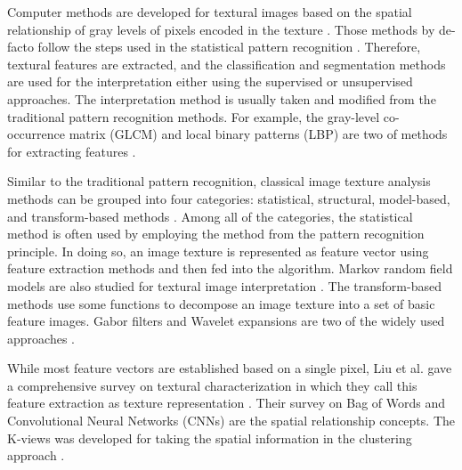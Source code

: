 \documentclass{aci}
\numberwithin{equation}{section}
\begin{document}
Computer methods are developed for textural images based on the spatial
relationship of gray levels of pixels encoded in the texture
\cite{haralick_image_1985,hung_image_2019}. Those methods by de-facto follow the
steps used in the statistical pattern recognition
\cite{fukunaga_introduction_2013}. Therefore, textural features are extracted,
and the classification and segmentation methods are used for the interpretation
either using the supervised or unsupervised approaches. The interpretation
method is usually taken and modified from the traditional pattern recognition
methods. For example, the gray-level co-occurrence matrix (GLCM) and local
binary patterns (LBP) are two of methods for extracting features
\cite{haralick_textural_1973, goos_gray_2000}.

Similar to the traditional pattern recognition, classical image texture analysis
methods can be grouped into four categories: statistical, structural,
model-based, and transform-based methods \cite{bharati_image_2004}. Among all of
the categories, the statistical method is often used by employing the method
from the pattern recognition principle.  In doing so, an image texture is
represented as feature vector using feature extraction methods and then fed into
the algorithm. Markov random field models are also studied for textural image
interpretation \cite{hassner_use_1981, cross_markov_1983}. The transform-based
methods use some functions to decompose an image texture into a set of basic
feature images. Gabor filters and Wavelet expansions are two of the widely used
approaches \cite{bovik_multichannel_1990}.

While most feature vectors are established based on a single pixel, Liu et al.
gave a comprehensive survey on textural characterization in which they call this
feature extraction as texture representation \cite{liu_bow_2019}. Their survey
on Bag of Words and Convolutional Neural Networks (CNNs)
\cite{krizhevsky_imagenet_2017} are the spatial relationship concepts. The
K-views was developed for taking the spatial information in the clustering
approach \cite{hung_image_2019}.
\end{document}
